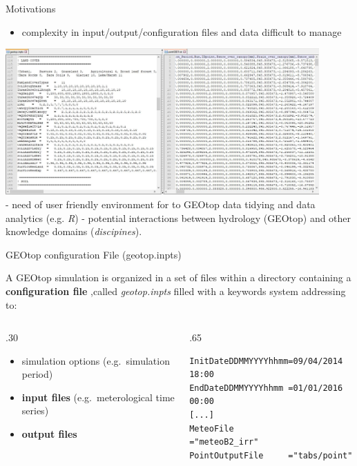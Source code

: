 \documentclass[ignorenonframetext,]{beamer}
\providecommand{\tightlist}{%
  \setlength{\itemsep}{0pt}\setlength{\parskip}{0pt}}
\def\begincols{\begin{columns}}
\def\begincol{\begin{column}}
\def\endcol{\end{column}}
\def\endcols{\end{columns}}
\begin{document}
\begin{frame}{Motivations}

\begin{itemize}
\tightlist
\item
  complexity in input/output/configuration files and data difficult to
  manage
\end{itemize}

\includegraphics[width=0.90000\textwidth]{resources/images/Capture_IO_GEOtopJPG.JPG}\\
- need of user friendly environment for to GEOtop data tidying and data
analytics (e.g. \emph{R}) - potential interactions between hydrology
(GEOtop) and other knowledge domains (\emph{discipines}).

\end{frame}

\begin{frame}[fragile]{GEOtop configuration File (geotop.inpts)}

A GEOtop simulation is organized in a set of files within a directory
containing a \textbf{configuration file} ,called \emph{geotop.inpts}
filled with a keywords system addressing to:

\begincols
 \begincol{.30\textwidth}

\begin{itemize}
\tightlist
\item
  simulation options (e.g.~simulation period)
\item
  \textbf{input files} (e.g.~meterological time series)
\item
  \textbf{output files}
\end{itemize}

\endcol
 \begincol{.65\textwidth}

\begin{verbatim}
InitDateDDMMYYYYhhmm=09/04/2014 18:00  
EndDateDDMMYYYYhhmm =01/01/2016 00:00 
[...] 
MeteoFile           ="meteoB2_irr" 
PointOutputFile     ="tabs/point" 
\end{verbatim}

\endcol
\endcols

\end{frame}
\end{document}
